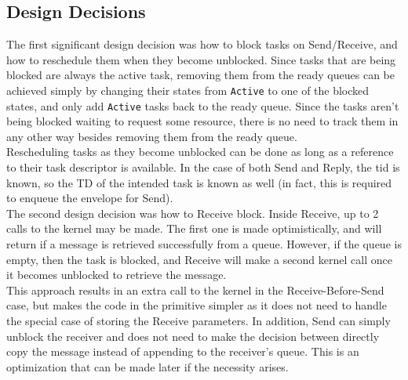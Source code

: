 \documentclass[12pt]{article}
\begin{document}
\subsection{Design Decisions}
The first significant design decision was how to block tasks on Send/Receive, and how to reschedule them when they become unblocked. Since tasks that are being blocked are always the active task, removing them from the ready queues can be achieved simply by changing their states from \texttt{Active} to one of the blocked states, and only add \texttt{Active} tasks back to the ready queue. Since the tasks aren't being blocked waiting to request some resource, there is no need to track them in any other way besides removing them from the ready queue.
\\
Rescheduling tasks as they become unblocked can be done as long as a reference to their task descriptor is available. In the case of both Send and Reply, the tid is known, so the TD of the intended task is known as well (in fact, this is required to enqueue the envelope for Send).
\\
The second design decision was how to Receive block. Inside Receive, up to 2 calls to the kernel may be made. The first one is made optimistically, and will return if a message is retrieved successfully from a queue. However, if the queue is empty, then the task is blocked, and Receive will make a second kernel call once it becomes unblocked to retrieve the message.
\\
This approach results in an extra call to the kernel in the Receive-Before-Send case, but makes the code in the primitive simpler as it does not need to handle the special case of storing the Receive parameters. In addition, Send can simply unblock the receiver and does not need to make the decision between directly copy the message instead of appending to the receiver's queue. This is an optimization that can be made later if the necessity arises.
\\[2\baselineskip]
\end{document}
